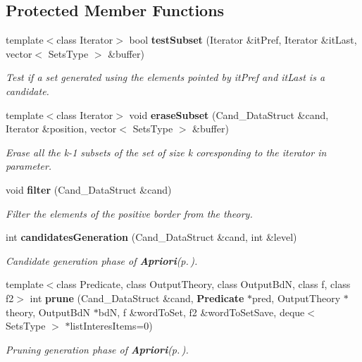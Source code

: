 \subsection*{Protected Member Functions}
\begin{CompactItemize}
\item 
template$<$class Iterator$>$ bool {\bf test\-Subset} (Iterator \&it\-Pref, Iterator \&it\-Last, vector$<$ Sets\-Type $>$ \&buffer)
\begin{CompactList}\small\item\em Test if a set generated using the elements pointed by it\-Pref and it\-Last is a candidate. \item\end{CompactList}\item 
template$<$class Iterator$>$ void {\bf erase\-Subset} (Cand\_\-Data\-Struct \&cand, Iterator \&position, vector$<$ Sets\-Type $>$ \&buffer)
\begin{CompactList}\small\item\em Erase all the k-1 subsets of the set of size k coresponding to the iterator in parameter. \item\end{CompactList}\item 
void {\bf filter} (Cand\_\-Data\-Struct \&cand)
\begin{CompactList}\small\item\em Filter the elements of the positive border from the theory. \item\end{CompactList}\item 
int {\bf candidates\-Generation} (Cand\_\-Data\-Struct \&cand, int \&level)
\begin{CompactList}\small\item\em Candidate generation phase of {\bf Apriori}{\rm (p.\,\pageref{class_apriori})}. \item\end{CompactList}\item 
template$<$class Predicate, class Output\-Theory, class Output\-Bd\-N, class f, class f2$>$ int {\bf prune} (Cand\_\-Data\-Struct \&cand, {\bf Predicate} $\ast$pred, Output\-Theory $\ast$theory, Output\-Bd\-N $\ast$bd\-N, f \&word\-To\-Set, f2 \&word\-To\-Set\-Save, deque$<$ Sets\-Type $>$ $\ast$list\-Interes\-Items=0)
\begin{CompactList}\small\item\em Pruning generation phase of {\bf Apriori}{\rm (p.\,\pageref{class_apriori})}. \item\end{CompactList}\end{CompactItemize}
